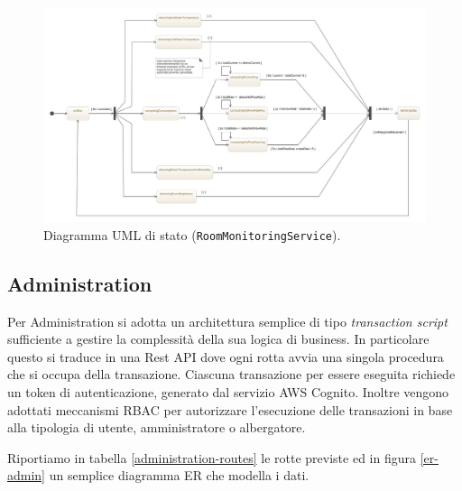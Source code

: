 \begin{figure}[H]
    \centering
    \hspace*{-1.5cm}\includegraphics[width=1.2\textwidth]{images/room-monitoring-service-state-diagram.jpeg}\hfill
    \caption{\label{rm-uml-state}Diagramma UML di stato (\texttt{RoomMonitoringService}).}
\end{figure}

\subsection{Administration}

Per Administration si adotta un architettura semplice di tipo \textit{transaction script} sufficiente a gestire la complessità della sua logica di business.
In particolare questo si traduce in una Rest API dove ogni rotta avvia una singola procedura che si occupa della transazione.
Ciascuna transazione per essere eseguita richiede un token di autenticazione, generato dal servizio AWS Cognito. 
Inoltre vengono adottati meccanismi RBAC per autorizzare l'esecuzione delle transazioni in base alla tipologia di utente, amministratore o albergatore.

Riportiamo in tabella \ref*{administration-routes} le rotte previste ed in figura \ref*{er-admin} un semplice diagramma ER che modella i dati.

